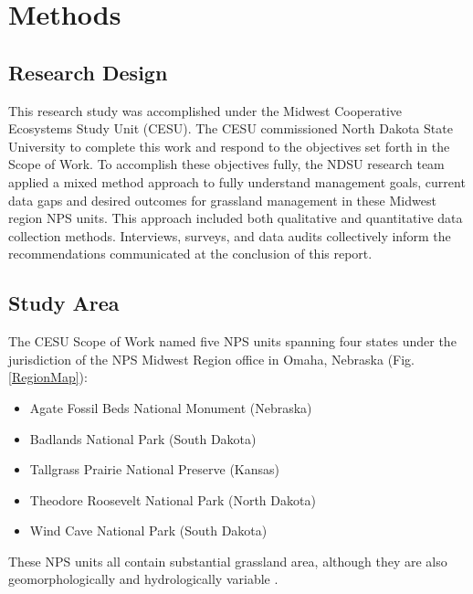 \hypertarget{methods}{%
	\section{Methods}\label{methods}}


\subsection*{Research Design}
This research study was accomplished under the Midwest Cooperative Ecosystems Study Unit (CESU). The CESU commissioned North Dakota State University to complete this work and respond to the objectives set forth in the Scope of Work. To accomplish these objectives fully, the NDSU research team applied a mixed method approach to fully understand management goals, current data gaps and desired outcomes for grassland management in these Midwest region NPS units. This approach included both qualitative and quantitative data collection methods. Interviews, surveys, and data audits collectively inform the recommendations communicated at the conclusion of this report. 
\subsection{Study Area}
The CESU Scope of Work named five NPS units spanning four states under the jurisdiction of the NPS Midwest Region office in Omaha, Nebraska (Fig. \ref{RegionMap}):
\begin{itemize}
\singlespacing
	\item Agate Fossil Beds National Monument (Nebraska) 
	\item Badlands National Park
(South Dakota) 
	\item Tallgrass Prairie National Preserve (Kansas)
	\item Theodore Roosevelt National Park (North Dakota)
	\item Wind Cave National Park (South Dakota)
\end{itemize}
	
 These NPS units all contain substantial grassland area,
although they are also geomorphologically and hydrologically variable \citep{gitzen2010}.

